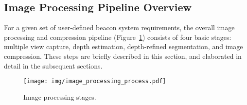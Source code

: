 
\subsection{Image Processing Pipeline Overview}

For a given set of user-defined beacon system requirements, the overall image processing and compression pipeline (Figure~\ref{fig:image_processing_process}) consists of four basic stages: multiple view capture, depth estimation, depth-refined segmentation, and image compression. These steps are briefly described in this section, and elaborated in detail in the subsequent sections.

\begin{figure}[!thb]
   \begin{center}
     \texttt{[image: img/image\_processing\_process.pdf]}
     \caption{\footnotesize Image processing stages.}
     \label{fig:image_processing_process}
     \vspace{-2em}
   \end{center}
\end{figure}

